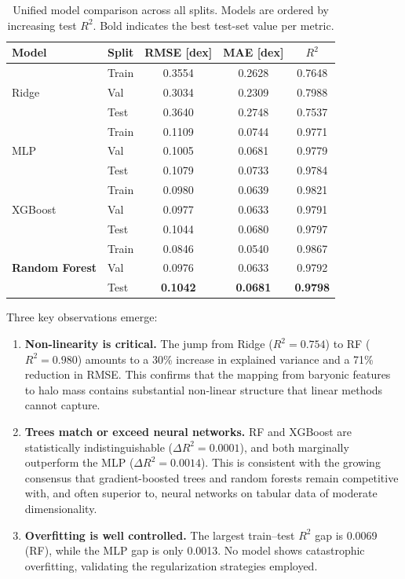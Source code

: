 \documentclass[12pt, a4paper]{article}
\begin{document}
\begin{table}[H]
  \centering
  \caption{Unified model comparison across all splits.  Models are ordered by increasing test $R^2$.  Bold indicates the best test-set value per metric.}
  \label{tab:unified}
  \begin{tabular}{@{}llccc@{}}
    \toprule
    Model & Split & RMSE [dex] & MAE [dex] & $R^2$ \\
    \midrule
    \multirow{3}{*}{Ridge}
      & Train & 0.3554 & 0.2628 & 0.7648 \\
      & Val   & 0.3034 & 0.2309 & 0.7988 \\
      & Test  & 0.3640 & 0.2748 & 0.7537 \\
    \midrule
    \multirow{3}{*}{MLP}
      & Train & 0.1109 & 0.0744 & 0.9771 \\
      & Val   & 0.1005 & 0.0681 & 0.9779 \\
      & Test  & 0.1079 & 0.0733 & 0.9784 \\
    \midrule
    \multirow{3}{*}{XGBoost}
      & Train & 0.0980 & 0.0639 & 0.9821 \\
      & Val   & 0.0977 & 0.0633 & 0.9791 \\
      & Test  & 0.1044 & 0.0680 & 0.9797 \\
    \midrule
    \multirow{3}{*}{\textbf{Random Forest}}
      & Train & 0.0846 & 0.0540 & 0.9867 \\
      & Val   & 0.0976 & 0.0633 & 0.9792 \\
      & Test  & \textbf{0.1042} & \textbf{0.0681} & \textbf{0.9798} \\
    \bottomrule
  \end{tabular}
\end{table}

Three key observations emerge:

\begin{enumerate}[nosep]
  \item \textbf{Non-linearity is critical.}  The jump from Ridge ($R^2 = 0.754$) to RF ($R^2 = 0.980$) amounts to a 30\% increase in explained variance and a 71\% reduction in RMSE.  This confirms that the mapping from baryonic features to halo mass contains substantial non-linear structure that linear methods cannot capture.
  
  \item \textbf{Trees match or exceed neural networks.}  RF and XGBoost are statistically indistinguishable ($\Delta R^2 = 0.0001$), and both marginally outperform the MLP ($\Delta R^2 = 0.0014$).  This is consistent with the growing consensus that gradient-boosted trees and random forests remain competitive with, and often superior to, neural networks on tabular data of moderate dimensionality.
  
  \item \textbf{Overfitting is well controlled.}  The largest train--test $R^2$ gap is 0.0069 (RF), while the MLP gap is only 0.0013.  No model shows catastrophic overfitting, validating the regularization strategies employed.
\end{enumerate}
\end{document}
